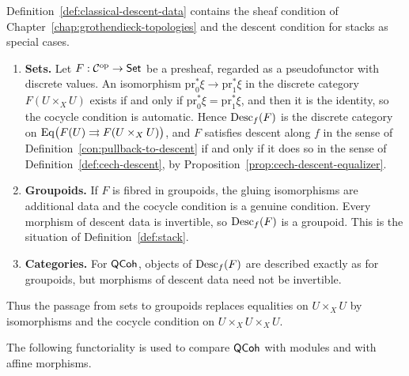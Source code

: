 \begin{remark}\label{rem:desc-sets}
	Definition~\ref{def:classical-descent-data} contains the sheaf condition of Chapter~\ref{chap:grothendieck-topologies} and the descent condition for stacks as special cases.
	\begin{enumerate}
		\item \textbf{Sets.} Let $F:\mathcal{C}^{\mathrm{op}}\to\mathsf{Set}$ be a presheaf, regarded as a pseudofunctor with discrete values. An isomorphism $\mathrm{pr}_0^*\xi\to\mathrm{pr}_1^*\xi$ in the discrete category $F(U\times_XU)$ exists if and only if $\mathrm{pr}_0^*\xi=\mathrm{pr}_1^*\xi$, and then it is the identity, so the cocycle condition is automatic. Hence $\operatorname{Desc}_f(F)$ is the discrete category on $\operatorname*{Eq}\bigl(F(U)\rightrightarrows F(U\times_XU)\bigr)$, and $F$ satisfies descent along $f$ in the sense of Definition~\ref{con:pullback-to-descent} if and only if it does so in the sense of Definition~\ref{def:cech-descent}, by Proposition~\ref{prop:cech-descent-equalizer}.
		\item \textbf{Groupoids.} If $F$ is fibred in groupoids, the gluing isomorphisms are additional data and the cocycle condition is a genuine condition. Every morphism of descent data is invertible, so $\operatorname{Desc}_f(F)$ is a groupoid. This is the situation of Definition~\ref{def:stack}.
		\item \textbf{Categories.} For $\mathsf{QCoh}$, objects of $\operatorname{Desc}_f(F)$ are described exactly as for groupoids, but morphisms of descent data need not be invertible.
	\end{enumerate}
	Thus the passage from sets to groupoids replaces equalities on $U\times_XU$ by isomorphisms and the cocycle condition on $U\times_XU\times_XU$.
\end{remark}

The following functoriality is used to compare $\mathsf{QCoh}$ with modules and with affine morphisms.

